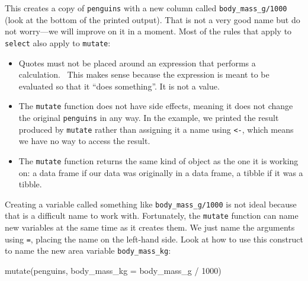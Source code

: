 \documentclass[
]{book}
\newenvironment{Shaded}{\begin{snugshade}}{\end{snugshade}}
\newcommand{\AttributeTok}[1]{\textcolor[rgb]{0.77,0.63,0.00}{#1}}
\newcommand{\DecValTok}[1]{\textcolor[rgb]{0.00,0.00,0.81}{#1}}
\newcommand{\FunctionTok}[1]{\textcolor[rgb]{0.00,0.00,0.00}{#1}}
\newcommand{\NormalTok}[1]{#1}
\newcommand{\SpecialCharTok}[1]{\textcolor[rgb]{0.00,0.00,0.00}{#1}}
\providecommand{\tightlist}{%
  \setlength{\itemsep}{0pt}\setlength{\parskip}{0pt}}
\begin{document}
This creates a copy of \texttt{penguins} with a new column called \texttt{body\_mass\_g/1000} (look at the bottom of the printed output). That is not a very good name but do not worry---we will improve on it in a moment. Most of the rules that apply to \texttt{select} also apply to \texttt{mutate}:

\begin{itemize}
\tightlist
\item
  Quotes must not be placed around an expression that performs a calculation.~ This makes sense because the expression is meant to be evaluated so that it ``does something''. It is not a value.
\item
  The \texttt{mutate} function does not have side effects, meaning it does not change the original \texttt{penguins} in any way. In the example, we printed the result produced by \texttt{mutate} rather than assigning it a name using \texttt{\textless{}-}, which means we have no way to access the result.
\item
  The \texttt{mutate} function returns the same kind of object as the one it is working on: a data frame if our data was originally in a data frame, a tibble if it was a tibble.
\end{itemize}

Creating a variable called something like \texttt{body\_mass\_g/1000} is not ideal because that is a difficult name to work with. Fortunately, the \texttt{mutate} function can name new variables at the same time as it creates them. We just name the arguments using \texttt{=}, placing the name on the left-hand side. Look at how to use this construct to name the new area variable \texttt{body\_mass\_kg}:

\begin{Shaded}
\begin{Highlighting}[]
\FunctionTok{mutate}\NormalTok{(penguins, }\AttributeTok{body\_mass\_kg =}\NormalTok{ body\_mass\_g }\SpecialCharTok{/} \DecValTok{1000}\NormalTok{)}
\end{Highlighting}
\end{Shaded}
\end{document}
